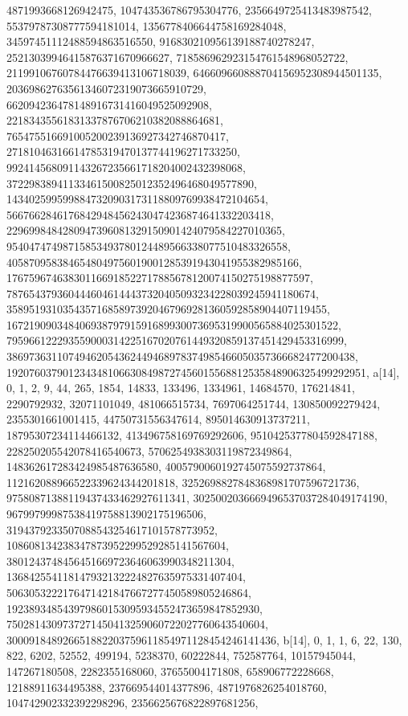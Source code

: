 {{{   4871993668126942475, 104743536786795304776, 2356649725413483987542, 
   55379787308777594181014, 1356778406644758169284048, 
   34597451112488594863516550, 916830210956139188740278247, 
   25213039946415876371670966627, 718586962923154761548968052722, 
   21199106760784476639413106718039, 646609660888704156952308944501135, 
   20369862763561346072319073665910729, 662094236478148916731416049525092908, 
   22183435561831337876706210382088864681, 
   765475516691005200239136927342746870417, 
   27181046316614785319470137744196271733250, 
   992414568091143267235661718204002432398068, 
   37229838941133461500825012352496468049577890, 
   1434025995998847320903173118809769938472104654, 
   56676628461768429484562430474236874641332203418, 
   2296998484280947396081329150901424079584227010365, 
   95404747498715853493780124489566338077510483326558, 
   4058709583846548049756019001285391943041955382985166, 
   176759674638301166918522717885678120074150275198877597, 
   7876543793604446046144437320405093234228039245941180674, 
   358951931035435716858973920467969281360592858904407119455, 
   16721909034840693879791591689930073695319900565884025301522, 
   795966122293559000314225167020761449320859137451429453316999, 
   38697363110749462054362449468978374985466050357366682477200438, 
   1920760379012343481066308498727456015568812535848906325499292951}}, 
 {a[14], {0, 1, 2, 9, 44, 265, 1854, 14833, 133496, 1334961, 14684570, 
   176214841, 2290792932, 32071101049, 481066515734, 7697064251744, 
   130850092279424, 2355301661001415, 44750731556347614, 895014630913737211, 
   18795307234114466132, 413496758169769292606, 9510425377804592847188, 
   228250205542078416540673, 5706254938303119872349864, 
   148362617283424985487636580, 4005790060192745075592737864, 
   112162088966522339624344201818, 3252698827848368981707596721736, 
   97580871388119437433462927611341, 3025002036669496537037284049174190, 
   96799799987538419758813902175196506, 
   3194379233507088543254617101578773952, 
   108608134238347873952299529285141567604, 
   3801243748456451669723646063990348211304, 
   136842554118147932132224827635975331407404, 
   5063053222176471421847667277450589805246864, 
   192389348543979860153095934552473659847852930, 
   7502814309737271450413259060722027760643540604, 
   300091848926651882203759611854971128454246141436}}, 
 {b[14], {0, 1, 1, 6, 22, 130, 822, 6202, 52552, 499194, 5238370, 60222844, 
   752587764, 10157945044, 147267180508, 2282355168060, 37655004171808, 
   658906772228668, 12188911634495388, 237669544014377896, 
   4871976826254018760, 104742902332392298296, 2356625676822897681256, 
}}}
